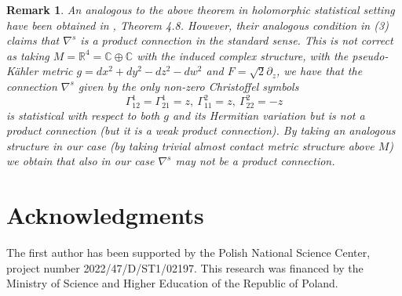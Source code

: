 \documentclass[12pt,a4paper,final]{amsart}
\numberwithin{equation}{section}
\newtheorem{uw}[tw]{Remark}
\theoremstyle{df}
\begin{document}
\begin{uw}
    An analogous to the above theorem in holomorphic statistical setting have been obtained in \cite{MNO}, Theorem 4.8. However,  their  analogous condition in (3) claims that $\nabla^s$ is a product connection in the standard sense. This is not correct as taking $M=\mathbb{R}^4=\mathbb{C}\oplus\mathbb{C}$ with the induced complex structure, with the pseudo-K\"ahler metric $g=dx^2+dy^2-dz^2-dw^2$ and $F=\sqrt{2}\partial_z$, we have that the connection $\nabla^s$ given by the only non-zero Christoffel symbols $$ \Gamma^1_{12}=\Gamma^1_{21}=z,\ \Gamma^2_{11}=z,\ \Gamma^2_{22}=-z  $$ 
    is statistical with respect to both $g$ and its Hermitian variation but is not a product connection (but it is a weak product connection). By taking an analogous structure in our case (by taking trivial almost contact metric structure above $M$) we obtain that also in our case $\nabla^s$ may not be a product connection. 
\end{uw}
\section*{Acknowledgments}
The first author has been supported by the Polish National Science Center, project number 2022/47/D/ST1/02197. This research was financed by the Ministry of Science and Higher Education of the Republic of Poland.
\end{document}
